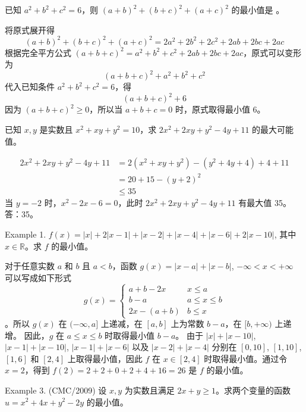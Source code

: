 \begin{questions}
\question 已知 $a^2 + b^2 + c^2 = 6$，则 $(a+b)^2 + (b+c)^2 + (a+c)^2$ 的最小值是 \underline{\phantom{ans}}。

\begin{solution}
将原式展开得
\[
(a+b)^2 + (b+c)^2 + (a+c)^2 = 2a^2 + 2b^2 + 2c^2 + 2ab + 2bc + 2ac
\]
根据完全平方公式 $(a+b+c)^2 = a^2 + b^2 + c^2 + 2ab + 2bc + 2ac$，原式可以变形为
\[
(a+b+c)^2 + a^2 + b^2 + c^2
\]
代入已知条件 $a^2 + b^2 + c^2 = 6$，得
\[
(a+b+c)^2 + 6
\]
因为 $(a+b+c)^2 \geqslant 0$，所以当 $a+b+c = 0$ 时，原式取得最小值 $6$。
\end{solution}
    \question 已知 $x, y$ 是实数且 $x^2 + xy + y^2 = 10$，求 $2x^2 + 2xy + y^2 - 4y + 11$ 的最大可能值。

\begin{solution}
\begin{align*}
2x^2 + 2xy + y^2 - 4y + 11 &= 2(x^2 + xy + y^2) - (y^2 + 4y + 4) + 4 + 11 \\
&= 20 + 15 - (y + 2)^2 \\
&\le 35
\end{align*}
当 $y = -2$ 时，$x^2 - 2x - 6 = 0$，此时 $2x^2 + 2xy + y^2 - 4y + 11$ 有最大值 35。
答：35。
\end{solution}

\question Example 1. $f(x) = |x| + 2|x - 1| + |x - 2| + |x - 4| + |x - 6| + 2|x - 10|$, 其中 $x \in \mathbb{R}$。求 $f$ 的最小值。

\begin{solution}
对于任意实数 $a$ 和 $b$ 且 $a < b$，函数 $g(x) = |x - a| + |x - b|$, $-\infty < x < +\infty$ 可以写成如下形式
\[
g(x) = \begin{cases} a + b - 2x & x \le a \\ b - a & a \le x \le b \\ 2x - (a + b) & b \le x \end{cases}
\]
。所以 $g(x)$ 在 $(-\infty, a]$ 上递减，在 $[a, b]$ 上为常数 $b - a$，在 $[b, +\infty)$ 上递增。
因此，$g$ 在 $a \le x \le b$ 时取得最小值 $b - a$。
由于 $|x| + |x - 10|$, $|x - 1| + |x - 10|$, $|x - 1| + |x - 6|$ 以及 $|x - 2| + |x - 4|$ 分别在 $[0, 10]$, $[1, 10]$, $[1, 6]$ 和 $[2, 4]$ 上取得最小值，因此 $f$ 在 $x \in [2, 4]$ 时取得最小值。通过令 $x = 2$，得到 $f(2) = 2 + 2 + 0 + 2 + 4 + 16 = 26$ 是 $f$ 的最小值。
\end{solution}

\question Example 3. (CMC/2009) 设 $x, y$ 为实数且满足 $2x + y \ge 1$。求两个变量的函数 $u = x^2 + 4x + y^2 - 2y$ 的最小值。


\end{questions}
